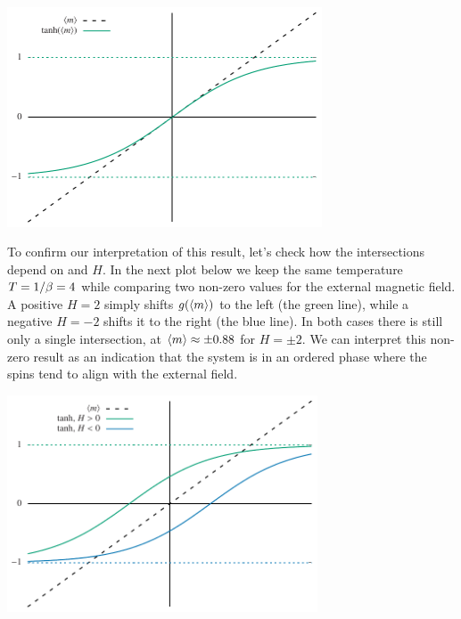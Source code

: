 \begin{center}\includegraphics[width=0.7\textwidth]{figs/unit09_consistency.pdf}\end{center}

To confirm our interpretation of this result, let's check how the intersections depend on \be and $H$.
In the next plot below we keep the same temperature $T = 1 / \beta = 4$ while comparing two non-zero values for the external magnetic field.
A positive $H = 2$ simply shifts $g(\left\langle m \right\rangle)$ to the left (the green line), while a negative $H = -2$ shifts it to the right (the blue line).
In both cases there is still only a single intersection, at $\left\langle m \right\rangle \approx \pm 0.88$ for $H = \pm 2$.
We can interpret this non-zero result as an indication that the system is in an ordered phase where the spins tend to align with the external field. \\[-24 pt]
\begin{center}\includegraphics[width=0.69\textwidth]{figs/unit09_consistency_H.pdf}\end{center} %

